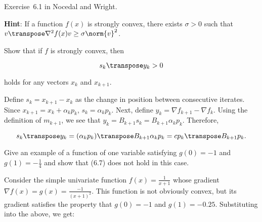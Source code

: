 \begin{problem}\label{prob:01}%
  Exercise~6.1 in Nocedal and Wright. 
  
  
  
  \textbf{Hint}: \textnormal{If a function $f(x)$ is strongly convex, there exists $\sigma > 0$ such that $v\transpose \nabla^{2}f(x) v \geq \sigma \norm{v}^2$.}
\end{problem}

\begin{subproblem}
  Show that if $f$ is strongly convex, then
  
  \[ s_{k}\transpose y_k > 0 \]

  \vspace{-1em}
  holds for any vectors $x_k$ and $x_{k+1}$.
\end{subproblem}

Define $s_k=x_{k+1}-x_k$ as the change in position between consecutive iterates.  Since $x_{k+1}=x_k + \alpha_k p_k$, $s_k = \alpha_k p_k$.  Next, define $y_k = \nabla f_{k+1} - \nabla f_k$.  Using the definition of $m_{k+1}$, we see that $y_k = B_{k+1}s_k=B_{k+1}\alpha_k p_k$.  Therefore,

\[ s_k\transpose y_k = (\alpha_k p_k)\transpose B_{k+1} \alpha_k p_k = c p_k\transpose B_{k+1} p_k\text{.} \]


\begin{subproblem}
  Give an example of a function of one variable satisfying $g(0)=-1$ and $g(1)=-\frac{1}{4}$ and show that (6.7) does not hold in this case.
\end{subproblem}

Consider the simple univariate function $f(x) =\frac{1}{x+1}$ whose gradient $\nabla f(x) = g(x)= \frac{-1}{(x+1)^2}$.  This function is not obviously convex, but its gradient satisfies the property that $g(0)=-1$ and $g(1) = -0.25$. Substituting into the above, we get:



